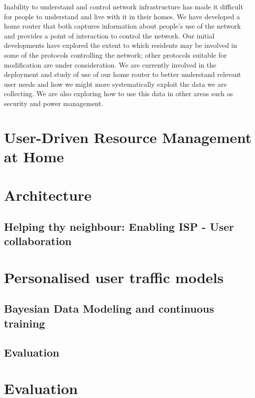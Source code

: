 Inability to understand and control network infrastructure has made it
difficult for people to understand and live with it in their homes.  We
have developed a home router that both captures information about
people's use of the network and provides a point of interaction to
control the network.  Our initial developments have explored the extent
to which residents may be involved in some of the protocols
controlling the network; other protocols suitable for modification are
under consideration.  We are currently involved in the deployment and
study of use of our home router to better understand relevant user needs and
how we might more systematically exploit the data we are
collecting.  We are also exploring how to use this data in other areas
such as security and power management.  

\section{User-Driven Resource Management at Home}

\section{Architecture}
\subsection{Helping thy neighbour: Enabling ISP - User collaboration}

\section{Personalised user traffic models}
\subsection{Bayesian Data Modeling and continuous training}
\subsection{Evaluation}
\section{Evaluation}

